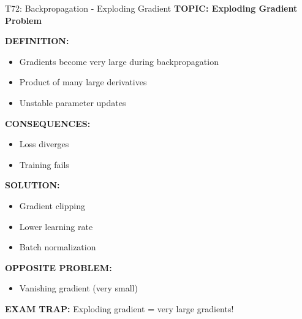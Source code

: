 \documentclass[8pt]{beamer}
\begin{document}
	\begin{frame}{T72: Backpropagation - Exploding Gradient}
		\fontsize{6.5}{7.5}\selectfont
		\textbf{TOPIC: Exploding Gradient Problem}
		
		\vspace{0.1cm}
		\textbf{DEFINITION:}
		\begin{itemize}
			\item Gradients become very large during backpropagation
			\item Product of many large derivatives
			\item Unstable parameter updates
		\end{itemize}
		
		\vspace{0.1cm}
		\textbf{CONSEQUENCES:}
		\begin{itemize}
			\item Loss diverges
			\item Training fails
		\end{itemize}
		
		\vspace{0.1cm}
		\textbf{SOLUTION:}
		\begin{itemize}
			\item Gradient clipping
			\item Lower learning rate
			\item Batch normalization
		\end{itemize}
		
		\vspace{0.1cm}
		\textbf{OPPOSITE PROBLEM:}
		\begin{itemize}
			\item Vanishing gradient (very small)
		\end{itemize}
		
		\textcolor{myred}{\textbf{EXAM TRAP:}} Exploding gradient = \textcolor{myblue}{very large gradients}!
	\end{frame}
	
\end{document}
